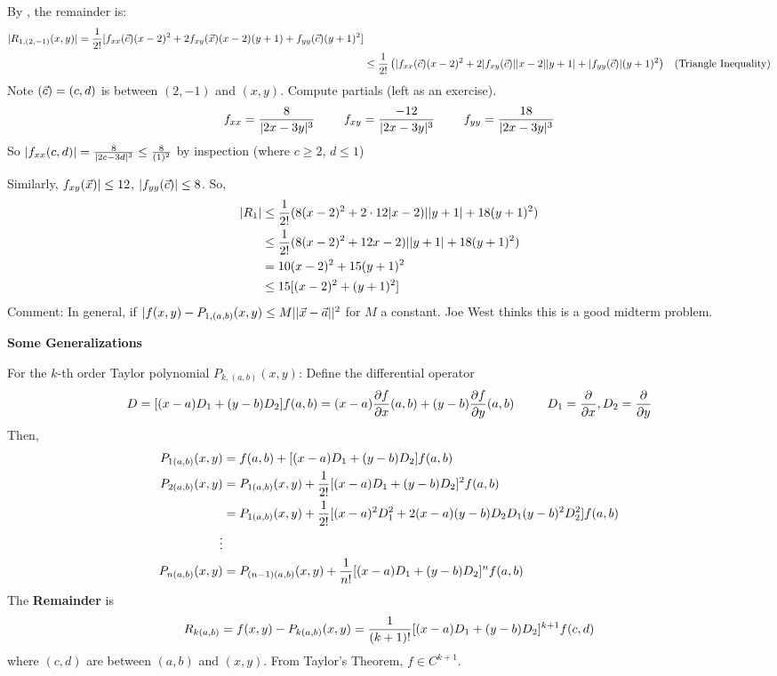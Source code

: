 \documentclass[english, 11pt]{article}
\begin{document}
\begin{exmp}
\begin{exmp}
    By , the remainder is:
    \begin{align*}
      |R_{1,(2,-1)}(x,y)| = \frac{1}{2!} [f_{xx}(\vec{c})(x-2)^2 + 2f_{xy}(\vec{x})(x-2)(y+1) + f_{yy}(\vec{c})(y+1)^2] \\
      & \leq \frac{1}{2!} \left( |f_{xx}(\vec{c})(x-2)^2 + 2|f_{xy}(\vec{c})||x-2||y+1| + |f_{yy}(\vec{c})|(y+1)^2 \right) & \mbox{(Triangle Inequality)}
    \end{align*}
    Note $(\vec{c}) = (c,d)$ is between $(2,-1)$ and $(x,y)$. Compute partials (left as an exercise).
    \[ f_{xx} = \frac{8}{|2x-3y|^3} \ \ \ \  \ \ \ f_{xy} = \frac{-12}{|2x-3y|^3} \ \ \ \ \ \ \ f_{yy} = \frac{18}{|2x-3y|^3} \]
    So $|f_{xx}(c,d)| = \frac{8}{|2c-3d|^3} \leq \frac{8}{(1)^2}$ by inspection (where $c \geq 2$, $d \leq 1$)
  \end{exmp}
  Similarly, $f_{xy}(\vec{x})| \leq 12$, $|f_{yy} (\vec{c})| \leq 8$. So,
  \begin{align*}
    |R_1| & \leq \frac{1}{2!} (8(x-2)^2 + 2\cdot 12|x-2)||y+1| + 18(y+1)^2) \\
    & \leq \frac{1}{2!} (8(x-2)^2 +  12x-2)||y+1| + 18(y+1)^2) \\
    & = 10(x-2)^2 + 15(y+1)^2 \\
    & \leq 15[(x-2)^2 + (y+1)^2]
  \end{align*}
  Comment: In general, if $|f(x,y) - P_{1,(a,b)}(x,y) \leq M||\vec{x} - \vec{a}||^2$ for $M$ a constant. Joe West thinks this is a good midterm problem.

  \textbf{Some Generalizations}

  For the $k$-th order Taylor polynomial $P_{k,(a,b)}(x,y)$: Define the differential operator
  \[ D = [(x-a)D_1 + (y-b)D_2]f(a,b) = (x-a) \pfx (a,b) + (y-b)\pfy (a,b) \ \ \ \ \ \ \ \ D_1 = \px, D_2 = \py \]
  Then,
  \begin{align*}
    P_{1(a,b)}(x,y) & = f(a,b) + [(x-a)D_1 + (y-b)D_2]f(a,b) \\
    P_{2(a,b)}(x,y) & = P_{1(a,b)}(x,y) + \frac{1}{2!}[(x-a)D_1 + (y-b)D_2]^2f(a,b) \\
    & = P_{1(a,b)}(x,y) + \frac{1}{2!}[(x-a)^2D_1^2 + 2(x-a)(y-b)D_2D_1 (y-b)^2D_2^2]f(a,b) \\
    \vdots \\
    P_{n(a,b)}(x,y) & = P_{(n-1)(a,b)}(x,y) + \frac{1}{n!}[(x-a)D_1 + (y-b)D_2]^nf(a,b) \\
  \end{align*}
  The \textbf{Remainder} is
  \[ R_{k(a,b)} = f(x,y) - P_{k(a,b)}(x,y) = \frac{1}{(k+1)!} [(x-a)D_1 + (y-b)D_2]^{k+1} f(c,d) \]
  where $(c,d)$ are between $(a,b)$ and $(x,y)$. From Taylor's Theorem, $f \in C^{k+1}$.\\



\end{exmp}
\end{document}
